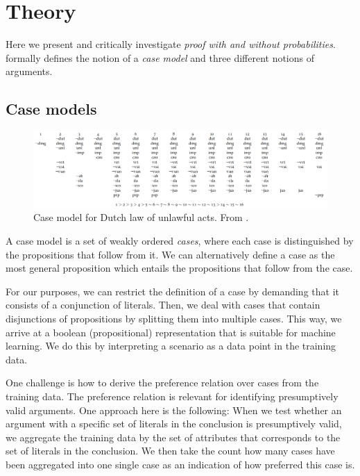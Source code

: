 \label{theory}
\chapter{Theory}

Here we present and critically investigate \textit{proof with and without probabilities}. \citet{verheijProofProbabilities2017} formally defines the notion of a \textit{case model} and three different notions of arguments.

\section{Case models}

\begin{figure}[htb]
        \includegraphics[width=\textwidth]{images/casemodel.png}
        \caption{Case model for Dutch law of unlawful acts. From \citet[fig.~23]{verheijArgumentsGoodArtificial2018}.}
        \label{fig:casemodel}
\end{figure}

A case model is a set of weakly ordered \textit{cases}, where each case is distinguished by the propositions that follow from it. We can alternatively define a case as the most general proposition which entails the propositions that follow from the case. 

For our purposes, we can restrict the definition of a case by demanding that it consists of a conjunction of literals. Then, we deal with cases that contain disjunctions of propositions by splitting them into multiple cases. This way, we arrive at a boolean (propositional) representation that is suitable for machine learning. We do this by interpreting a scenario as a data point in the training data.

One challenge is how to derive the preference relation over cases from the training data. The preference relation is relevant for identifying presumptively valid arguments. One approach here is the following: When we test whether an argument with a specific set of literals in the conclusion is presumptively valid, we aggregate the training data by the set of attributes that corresponds to the set of literals in the conclusion. We then take the count how many cases have been aggregated into one single case as an indication of how preferred this case is. 

